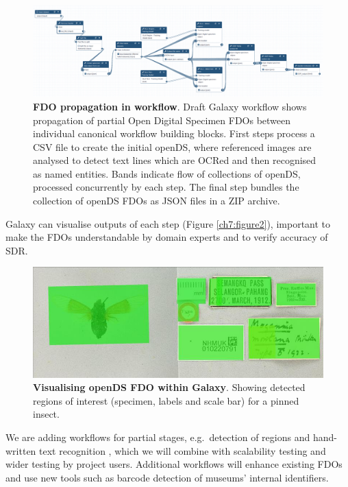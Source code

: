 \begin{figure}%
    \includegraphics[width=\textwidth]{figures/ch07/figure1.png}
	\caption[FDO propagation in workflow]{\textbf{FDO propagation in workflow}. 
    Draft Galaxy workflow \cite{Brack 2022} 
    shows propagation of partial Open Digital Specimen FDOs between
    individual canonical workflow building blocks. First steps process a CSV
    file to create the initial openDS, where referenced images are analysed
    to detect text lines which are OCRed and then recognised as named
    entities. Bands indicate flow of collections of openDS, processed
    concurrently by each step. The final step bundles the collection of
    openDS FDOs as JSON files in a ZIP archive.}
    \label{ch7:figure1}
  \end{figure}

Galaxy can visualise outputs of each step
(Figure \vref{ch7:figure2}), important to make the
FDOs understandable by domain experts and to verify accuracy of SDR.

\begin{figure}%
    \includegraphics[width=\textwidth]{figures/ch07/figure2.jpg}
	\caption[Visualising openDS FDO within Galaxy]{\textbf{Visualising openDS FDO within Galaxy}.
    Showing detected regions of interest
    (specimen, labels and scale bar) for a pinned insect.}
    \label{ch7:figure2}
\end{figure}

We are adding workflows for partial stages, e.g.~detection of regions
\cite{Livermore 2022a} and hand-written text recognition
\cite{Livermore 2022b}, which we will combine with scalability testing and wider
testing by project users. Additional workflows will enhance existing
FDOs and use new tools such as barcode detection of museums' internal
identifiers.

